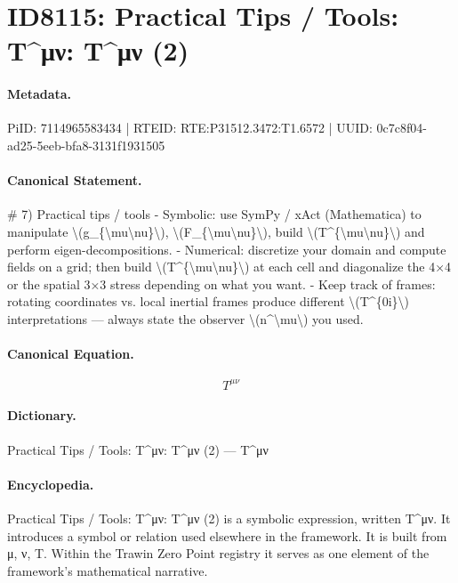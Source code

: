 \section*{ID8115: Practical Tips / Tools: T\textasciicircum{}μν: T\textasciicircum{}μν (2)}
\paragraph{Metadata.}
PiID: 7114965583434 | RTEID: RTE:P31512.3472:T1.6572 | UUID: 0c7c8f04-ad25-5eeb-bfa8-3131f1931505

\paragraph{Canonical Statement.}
\# 7) Practical tips / tools - Symbolic: use SymPy / xAct (Mathematica) to manipulate \textbackslash{}(g\_\{\textbackslash{}mu\textbackslash{}nu\}\textbackslash{}), \textbackslash{}(F\_\{\textbackslash{}mu\textbackslash{}nu\}\textbackslash{}), build \textbackslash{}(T\textasciicircum{}\{\textbackslash{}mu\textbackslash{}nu\}\textbackslash{}) and perform eigen-decompositions. - Numerical: discretize your domain and compute fields on a grid; then build \textbackslash{}(T\textasciicircum{}\{\textbackslash{}mu\textbackslash{}nu\}\textbackslash{}) at each cell and diagonalize the 4×4 or the spatial 3×3 stress depending on what you want. - Keep track of frames: rotating coordinates vs. local inertial frames produce different \textbackslash{}(T\textasciicircum{}\{0i\}\textbackslash{}) interpretations — always state the observer \textbackslash{}(n\textasciicircum{}\textbackslash{}mu\textbackslash{}) you used.

\paragraph{Canonical Equation.}
\[
T^{\mu\nu}
\]

\paragraph{Dictionary.}
Practical Tips / Tools: T\textasciicircum{}μν: T\textasciicircum{}μν (2) — T\textasciicircum{}μν

\paragraph{Encyclopedia.}
Practical Tips / Tools: T\textasciicircum{}μν: T\textasciicircum{}μν (2) is a symbolic expression, written T\textasciicircum{}μν. It introduces a symbol or relation used elsewhere in the framework. It is built from μ, ν, T. Within the Trawin Zero Point registry it serves as one element of the framework's mathematical narrative.
